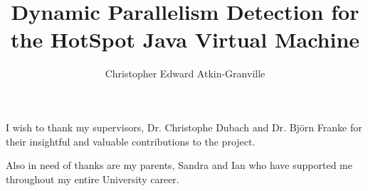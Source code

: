 \documentclass[msc,cs,parskip,leftchapter,logo,twoside,abbrevs,11pt]{infthesis}
\title{Dynamic Parallelism Detection for the HotSpot Java Virtual Machine}
\author{Christopher Edward Atkin-Granville}
\begin{document}
	\begin{preliminary}
		\maketitle
		\begin{acknowledgements}
		I wish to thank my supervisors, Dr. Christophe Dubach and Dr. Bj\"{o}rn Franke for their insightful and valuable contributions to the project.

		Also in need of thanks are my parents, Sandra and Ian who have supported me throughout my entire University career.
		\end{acknowledgements}
		\standarddeclaration
		\dedication{To my grandfather, Leslie.}
		\tableofcontents
		\listoffigures
		\listofalgorithms
	\end{preliminary}

	
	
	
	
	
	
	
	

	
	
\end{document}
